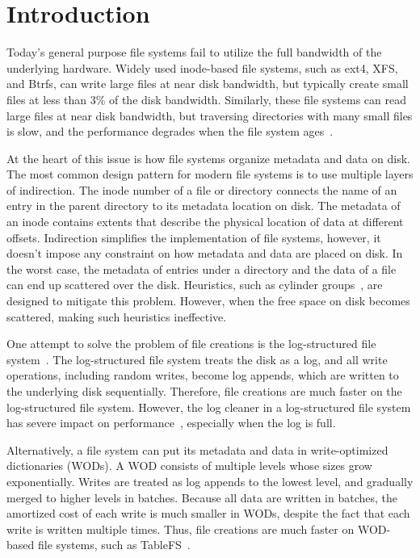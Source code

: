 \chapter{Introduction}
\label{chap:intro}

Today's general purpose file systems fail to utilize the full bandwidth of the
underlying hardware.
Widely used inode-based file systems, such as ext4, XFS, and Btrfs, can write
large files at near disk bandwidth,
but typically create small files at less than 3\% of the disk bandwidth.
Similarly, these file systems can read large files at near disk bandwidth,
but traversing directories with many small files is slow, and the performance
degrades when the file system ages~\citep{betrfs3}.

At the heart of this issue is how file systems organize metadata and data
on disk.
The most common design pattern for modern file systems is to use multiple layers
of indirection.
The inode number of a file or directory connects the name of an entry in the
parent directory to its metadata location on disk.
The metadata of an inode contains extents that describe the physical location
of data at different offsets.
Indirection simplifies the implementation of file systems, however,
it doesn't impose any constraint on how metadata and data are placed on disk.
In the worst case, the metadata of entries under a directory and the data of
a file can end up scattered over the disk.
Heuristics, such as cylinder groups~\citep{ffs1}, are designed to mitigate this
problem.
However, when the free space on disk becomes scattered, making such heuristics
ineffective.

One attempt to solve the problem of file creations is the log-structured file
system~\citep{lfs}.
The log-structured file system treats the disk as a log,
and all write operations, including random writes, become log appends,
which are written to the underlying disk sequentially.
Therefore, file creations are much faster on the log-structured file system.
However, the log cleaner in a log-structured file system has severe impact on
performance~\citep{lfsbsd}, especially when the log is full.

Alternatively, a file system can put its metadata and data in write-optimized
dictionaries (WODs).
A WOD consists of multiple levels whose sizes grow exponentially.
Writes are treated as log appends to the lowest level, and gradually merged to
higher levels in batches.
Because all data are written in batches, the amortized cost of each write is
much smaller in WODs,
despite the fact that each write is written multiple times.
Thus, file creations are much faster on WOD-based file systems, such as
TableFS~\citep{tablefs}.

